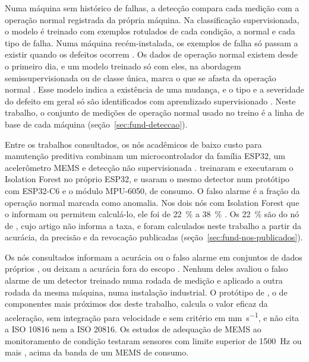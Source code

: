 Numa máquina sem histórico de falhas, a detecção compara cada medição com a operação normal registrada da própria máquina. Na classificação supervisionada, o modelo é treinado com exemplos rotulados de cada condição, a normal e cada tipo de falha. Numa máquina recém-instalada, os exemplos de falha só passam a existir quando os defeitos ocorrem \cite{chandola2009}. Os dados de operação normal existem desde o primeiro dia, e um modelo treinado só com eles, na abordagem semissupervisionada ou de classe única, marca o que se afasta da operação normal \cite{chandola2009,pimentel2014}. Esse modelo indica a existência de uma mudança, e o tipo e a severidade do defeito em geral só são identificados com aprendizado supervisionado \cite[p.~1640]{worden2007}. Neste trabalho, o conjunto de medições de operação normal usado no treino é a linha de base de cada máquina (seção~\ref{sec:fund-deteccao}).


Entre os trabalhos consultados, os nós acadêmicos de baixo custo para manutenção preditiva combinam um microcontrolador da família ESP32, um acelerômetro MEMS e detecção não supervisionada \cite{antonini2023,chevtchenko2023,kolok2025}.  treinaram e executaram o Isolation Forest \cite{liu2008} no próprio ESP32, e  usaram o mesmo detector num protótipo com ESP32-C6 e o módulo MPU-6050, de consumo. O falso alarme é a fração da operação normal marcada como anomalia. Nos dois nós com Isolation Forest que o informam ou permitem calculá-lo, ele foi de \SI{22}{\percent} a \SI{38}{\percent} \cite{chevtchenko2023,kolok2025}. Os \SI{22}{\percent} são do nó de , cujo artigo não informa a taxa, e foram calculados neste trabalho a partir da acurácia, da precisão e da revocação publicadas (seção~\ref{sec:fund-nos-publicados}).

Os nós consultados informam a acurácia ou o falso alarme em conjuntos de dados próprios \cite{chevtchenko2023,kolok2025}, ou deixam a acurácia fora do escopo \cite{antonini2023}. Nenhum deles avaliou o falso alarme de um detector treinado numa rodada de medição e aplicado a outra rodada da mesma máquina, numa instalação industrial. O protótipo de , o de componentes mais próximos dos deste trabalho, calcula o valor eficaz da aceleração, sem integração para velocidade e sem critério em \si{\milli\meter\per\second}, e não cita a ISO 10816 nem a ISO 20816. Os estudos de adequação de MEMS ao monitoramento de condição testaram sensores com limite superior de \SI{1500}{\hertz} ou mais \cite{albarbar2008,fidali2024}, acima da banda de um MEMS de consumo.


